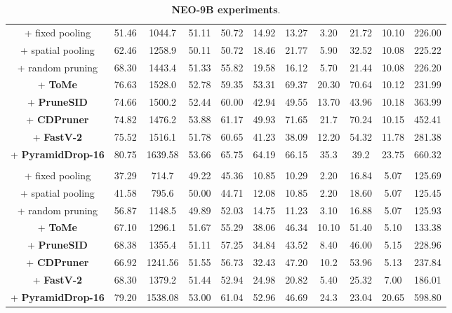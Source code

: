 \documentclass[11pt]{article}
\begin{document}
\begin{table}[ht]
{\begin{tabular}{c|cccc|cccc|cc}
        + fixed pooling & 51.46 & 1044.7 & 51.11 & 50.72 & 14.92 & 13.27 & 3.20 & 21.72 & 10.10 & 226.00 \\
        + spatial pooling & 62.46 & 1258.9 & 50.11 & 50.72 & 18.46 & 21.77 & 5.90 & 32.52 & 10.08 & 225.22 \\
        + random pruning & 68.30 & 1443.4 & 51.33 & 55.82 & 19.58 & 16.12 & 5.70 & 21.44 & 10.08 & 226.20  \\
        + \textbf{ToMe} & 76.63 & 1528.0 & 52.78 & 59.35 & 53.31 & 69.37 & 20.30 & 70.64 & 10.12 & 231.99 \\
        + \textbf{PruneSID} & 74.66 & 1500.2 & 52.44 & 60.00 & 42.94 & 49.55 & 13.70 & 43.96 & 10.18 & 363.99 \\
        + \textbf{CDPruner} & 74.82 & 1476.2 & 53.88 & 61.17 & 49.93 & 71.65 & 21.7 & 70.24 & 10.15 & 452.41 \\
        \hline
        + \textbf{FastV-2} & 75.52 & 1516.1 & 51.78 & 60.65 & 41.23 & 38.09 & 12.20 & 54.32 & 11.78 & 281.38 \\
        + \textbf{PyramidDrop-16} & 80.75 & 1639.58 & 53.66 & 65.75 & 64.19 & 66.15 & 35.3 & 39.2 & 23.75 & 660.32 \\
        \rowcolor{green!10}\multicolumn{11}{c}{8x compression} \\
        + fixed pooling & 37.29 & 714.7 & 49.22 & 45.36 & 10.85 & 10.29 & 2.20 & 16.84 & 5.07 & 125.69 \\
        + spatial pooling & 41.58 & 795.6 & 50.00 & 44.71 & 12.08 & 10.85 & 2.20 & 18.60 & 5.07 & 125.45 \\
        + random pruning & 56.87 & 1148.5 & 49.89 & 52.03 & 14.75 & 11.23 & 3.10 & 16.88 & 5.07 & 125.93 \\
        + \textbf{ToMe} & 67.10 & 1296.1 & 51.67 & 55.29 & 38.06 & 46.34 & 10.10 & 51.40 & 5.10 & 133.38 \\
        + \textbf{PruneSID} & 68.38 & 1355.4 & 51.11 & 57.25 & 34.84 & 43.52 & 8.40 & 46.00 & 5.15 & 228.96 \\
        + \textbf{CDPruner} & 66.92 & 1241.56 & 51.55 & 56.73 & 32.43 & 47.20 & 10.2 & 53.96 & 5.13 & 237.84 \\
        \hline
        + \textbf{FastV-2} & 68.30 & 1379.2 & 51.44 & 52.94 & 24.98 & 20.82 & 5.40 & 25.32 & 7.00 & 186.01 \\
        + \textbf{PyramidDrop-16} & 79.20 & 1538.08 & 53.00 & 61.04 & 52.96 & 46.69 & 24.3 & 23.04 & 20.65 & 598.80 \\
        \bottomrule
    \end{tabular}}
    \caption{\textbf{NEO-9B experiments}.}
    \label{tab:results-9B}
\end{table}
\end{document}
